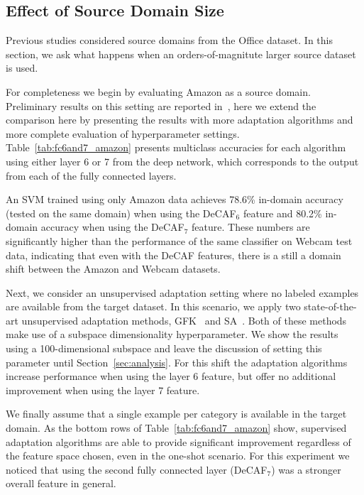 

\subsection{Effect of Source Domain Size}
Previous studies considered source domains from the Office dataset. In this section, we ask what happens when an orders-of-magnitute larger source dataset is used.

For completeness we begin by evaluating Amazon as a source domain. 
Preliminary results on this setting are reported in~\cite{deeplearning-arxiv-2013}, here 
we extend the comparison here by
presenting the results with more adaptation algorithms and more complete
evaluation of hyperparameter settings. Table~\ref{tab:fc6and7_amazon} presents
multiclass accuracies for each algorithm using either layer 6 or 7 from the deep
network, which corresponds to the output from each of the fully connected layers.

An SVM trained using only Amazon data achieves 78.6\% in-domain accuracy (tested on the same domain) when using the DeCAF$_6$ feature and 80.2\% in-domain accuracy when using the DeCAF$_7$ feature. These numbers are significantly higher than the performance of the same classifier on Webcam test data, indicating that even with the DeCAF features, there is a still a domain shift between the Amazon and Webcam datasets. 

Next, we consider an unsupervised adaptation setting where no labeled examples are available from the target dataset. In this scenario, we apply two state-of-the-art unsupervised adaptation methods, GFK~\cite{gong-cvpr12} and SA~\cite{sa}. 
Both of these methods make use of a subspace dimensionality hyperparameter.
We show the results using a 100-dimensional subspace and leave the discussion of setting this parameter until Section~\ref{sec:analysis}. For this shift the adaptation algorithms increase performance when using the layer 6 feature, but offer no additional improvement when using the layer 7 feature. 

We finally assume that a single example per category is available in the target domain.
As the bottom rows of Table~\ref{tab:fc6and7_amazon} show, supervised adaptation algorithms are able to provide significant improvement regardless of the feature space chosen, even in the one-shot scenario.
For this experiment we noticed that using the second fully connected layer (DeCAF$_7$) was a stronger overall feature in general.

